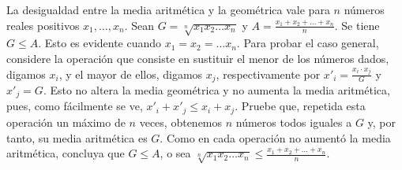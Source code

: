 
La desigualdad entre la media aritmética y la geométrica vale para $n$ números reales positivos $x_1,\ldots,x_n$.
Sean $G = \sqrt[n]{x_1x_2\ldots x_n}$ y $A = \frac{x_1+x_2+\ldots+x_n}{n}$. Se tiene $G\leq A$. Esto es evidente cuando $x_1 = x_2 = \ldots x_n$.
Para probar el caso general, considere la operación que consiste en sustituir el menor de los números dados, digamos $x_i$, y el mayor de ellos, digamos $x_j$, respectivamente por $x'_i = \frac{x_i\cdot x_j}{G}$ y $x'_j = G$.
Esto no altera la media geométrica y no aumenta la media aritmética, pues, como fácilmente se ve, $x'_i+x'_j \leq x_i+x_j$.
Pruebe que, repetida esta operación un máximo de $n$ veces, obtenemos $n$ números todos iguales a $G$ y, por tanto, su media aritmética es $G$.
Como en cada operación no aumentó la media aritmética, concluya que $G\leq A$, o sea $\sqrt[n]{x_1x_2\ldots x_n} \leq \frac{x_1+x_2+\ldots+x_n}{n}$.